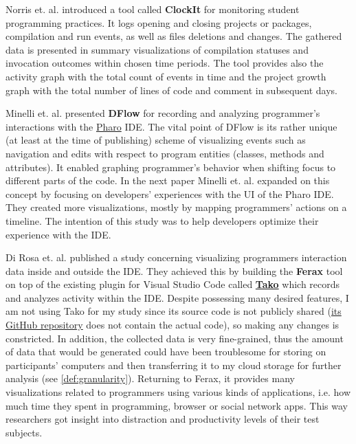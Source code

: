 Norris et. al. \cite{Nor08ClockIt} introduced a tool called \textbf{ClockIt} for monitoring student programming practices. It logs opening and closing projects or packages, compilation and run events, as well as files deletions and changes. The gathered data is presented in summary visualizations of compilation statuses and invocation outcomes within chosen time periods. The tool provides also the activity graph with the total count of events in time and the project growth graph with the total number of lines of code and comment in subsequent days.

Minelli et. al. \cite{Min13DFlow} presented \textbf{DFlow} for recording and analyzing programmer's interactions with the \href{https://pharo.org/}{Pharo} IDE. The vital point of DFlow is its rather unique (at least at the time of publishing) scheme of visualizing events such as navigation and edits with respect to program entities (classes, methods and attributes). It enabled graphing programmer's behavior when shifting focus to different parts of the code. In the next paper \cite{Min14DFlow2} Minelli et. al. expanded on this concept by focusing on developers' experiences with the UI of the Pharo IDE. They created more visualizations, mostly by mapping programmers' actions on a timeline. The intention of this study was to help developers optimize their experience with the IDE.

Di Rosa et. al. \cite{Rosa20Ferax} published a study concerning visualizing programmers interaction data inside and outside the
IDE. They achieved this by building the \textbf{Ferax} tool on top of the existing plugin for Visual Studio Code called \href{https://marketplace.visualstudio.com/items?itemName=codelounge.tako}{\textbf{Tako}} which records and analyzes activity within the IDE. Despite possessing many desired features, I am not using Tako for my study since its source code is not publicly shared (\href{https://github.com/si-codelounge/tako}{its GitHub repository} does not contain the actual code), so making any changes is constricted. In addition, the collected data is very fine-grained, thus the amount of data that would be generated could have been troublesome for storing on participants' computers and then transferring it to my cloud storage for further analysis (see \ref{def:granularity}). Returning to Ferax, it provides many visualizations related to programmers using various kinds of applications, i.e. how much time they spent in programming, browser or social network apps. This way researchers got insight into distraction and productivity levels of their test subjects.


